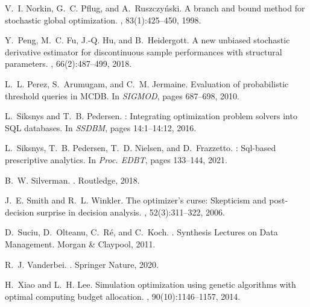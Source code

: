 \documentclass[11pt]{article}
\begin{document}
{\begin{thebibliography}{10}
V.~I. Norkin, G.~C. Pflug, and A.~Ruszczy{\'n}ski.
\newblock A branch and bound method for stochastic global optimization.
, 83(1):425--450, 1998.

Y.~Peng, M.~C. Fu, J.-Q. Hu, and B.~Heidergott.
\newblock A new unbiased stochastic derivative estimator for discontinuous
  sample performances with structural parameters.
, 66(2):487--499, 2018.

L.~L. Perez, S.~Arumugam, and C.~M. Jermaine.
\newblock Evaluation of probabilistic threshold queries in {MCDB}.
\newblock In {\em SIGMOD}, pages 687--698, 2010.

L.~Siksnys and T.~B. Pedersen.
: Integrating optimization problem solvers into {SQL}
  databases.
\newblock In {\em SSDBM}, pages 14:1--14:12, 2016.

L.~Siksnys, T.~B. Pedersen, T.~D. Nielsen, and D.~Frazzetto.
: Sql-based prescriptive analytics.
\newblock In {\em Proc. EDBT}, pages 133--144, 2021.

B.~W. Silverman.
.
\newblock Routledge, 2018.

J.~E. Smith and R.~L. Winkler.
\newblock The optimizer's curse: Skepticism and post-decision surprise in
  decision analysis.
, 52(3):311--322, 2006.

D.~Suciu, D.~Olteanu, C.~R{\'e}, and C.~Koch.
.
\newblock Synthesis Lectures on Data Management. Morgan \& Claypool, 2011.

R.~J. Vanderbei.
.
\newblock Springer Nature, 2020.

H.~Xiao and L.~H. Lee.
\newblock Simulation optimization using genetic algorithms with optimal
  computing budget allocation.
, 90(10):1146--1157, 2014.

\end{thebibliography}
}
\end{document}
